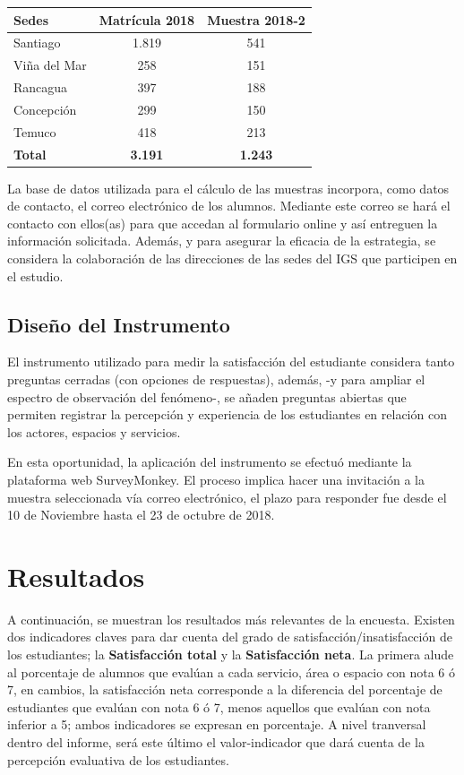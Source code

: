\documentclass[]{book}
\begin{document}
\begin{longtable}[]{@{}lcc@{}}
\toprule
Sedes & Matrícula 2018 & Muestra 2018-2\tabularnewline
\midrule
\endhead
Santiago & 1.819 & 541\tabularnewline
Viña del Mar & 258 & 151\tabularnewline
Rancagua & 397 & 188\tabularnewline
Concepción & 299 & 150\tabularnewline
Temuco & 418 & 213\tabularnewline
\textbf{Total} & \textbf{3.191} & \textbf{1.243}\tabularnewline
\bottomrule
\end{longtable}

La base de datos utilizada para el cálculo de las muestras incorpora,
como datos de contacto, el correo electrónico de los alumnos. Mediante
este correo se hará el contacto con ellos(as) para que accedan al
formulario online y así entreguen la información solicitada. Además, y
para asegurar la eficacia de la estrategia, se considera la colaboración
de las direcciones de las sedes del IGS que participen en el estudio.

\section{Diseño del Instrumento}\label{diseno-del-instrumento}

El instrumento utilizado para medir la satisfacción del estudiante
considera tanto preguntas cerradas (con opciones de respuestas), además,
-y para ampliar el espectro de observación del fenómeno-, se añaden
preguntas abiertas que permiten registrar la percepción y experiencia de
los estudiantes en relación con los actores, espacios y servicios.

En esta oportunidad, la aplicación del instrumento se efectuó mediante
la plataforma web SurveyMonkey. El proceso implica hacer una invitación
a la muestra seleccionada vía correo electrónico, el plazo para
responder fue desde el 10 de Noviembre hasta el 23 de octubre de 2018.

\chapter{Resultados}\label{resultados}

A continuación, se muestran los resultados más relevantes de la
encuesta. Existen dos indicadores claves para dar cuenta del grado de
satisfacción/insatisfacción de los estudiantes; la \textbf{Satisfacción
total} y la \textbf{Satisfacción neta}. La primera alude al porcentaje
de alumnos que evalúan a cada servicio, área o espacio con nota 6 ó 7,
en cambios, la satisfacción neta corresponde a la diferencia del
porcentaje de estudiantes que evalúan con nota 6 ó 7, menos aquellos que
evalúan con nota inferior a 5; ambos indicadores se expresan en
porcentaje. A nivel tranversal dentro del informe, será este último el
valor-indicador que dará cuenta de la percepción evaluativa de los
estudiantes.
\end{document}
